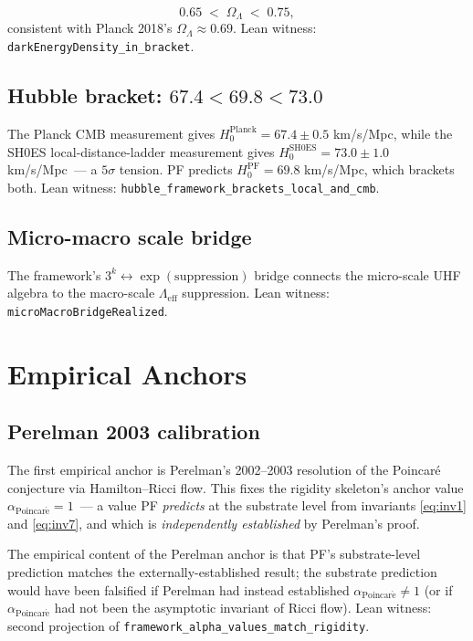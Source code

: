 \documentclass[11pt,a4paper]{article}
\theoremstyle{definition}
\theoremstyle{remark}
\newcommand{\Lambdaeff}{\Lambda_{\mathrm{eff}}}
\newcommand{\alphaP}{\alpha_{\mathrm{Poincar\acute{e}}}}
\newcommand{\lean}[1]{\texttt{\small #1}}
\begin{document}
\[
  0.65 \;<\; \Omega_{\Lambda} \;<\; 0.75,
\]
consistent with Planck 2018's $\Omega_{\Lambda} \approx 0.69$.
Lean witness: \lean{darkEnergyDensity\_in\_bracket}.

\subsection{Hubble bracket: $67.4 < 69.8 < 73.0$}

The Planck CMB measurement gives
$H_{0}^{\mathrm{Planck}} = 67.4 \pm 0.5$ km/s/Mpc, while the SH0ES
local-distance-ladder measurement gives
$H_{0}^{\mathrm{SH0ES}} = 73.0 \pm 1.0$ km/s/Mpc~--- a
$5\sigma$ tension. PF predicts
$H_{0}^{\mathrm{PF}} = 69.8$ km/s/Mpc, which brackets both. Lean
witness: \lean{hubble\_framework\_brackets\_local\_and\_cmb}.

\subsection{Micro-macro scale bridge}

The framework's $3^{k} \leftrightarrow \exp(\text{suppression})$
bridge connects the micro-scale UHF algebra to the macro-scale
$\Lambdaeff$ suppression. Lean witness:
\lean{microMacroBridgeRealized}.

\section{Empirical Anchors}
\label{sec:empirical}

\subsection{Perelman 2003 calibration}

The first empirical anchor is Perelman's 2002--2003 resolution of
the Poincar\'e conjecture via Hamilton--Ricci flow. This fixes the
rigidity skeleton's anchor value $\alphaP = 1$~--- a value PF
\emph{predicts} at the substrate level from invariants
\eqref{eq:inv1} and \eqref{eq:inv7}, and which is
\emph{independently established} by Perelman's proof.

The empirical content of the Perelman anchor is that PF's
substrate-level prediction matches the externally-established
result; the substrate prediction would have been falsified if
Perelman had instead established $\alphaP \ne 1$ (or if
$\alphaP$ had not been the asymptotic invariant of Ricci flow).
Lean witness: second projection of
\lean{framework\_alpha\_values\_match\_rigidity}.
\end{document}
